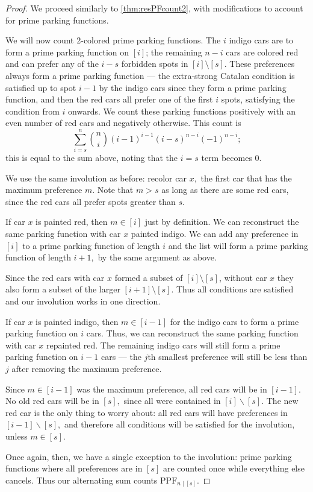 \documentclass[12 pt]{amsart}
\theoremstyle{definition} %
\theoremstyle{remark} %
\begin{document}
\begin{proof}
    We proceed similarly to \cref{thm:resPFcount2}, with modifications to account for prime parking functions.
    
    We will now count 2-colored prime parking functions. The $i$ indigo cars are to form a prime parking function on $[i]$; the remaining $n - i$ cars are colored red and can prefer any of the $i - s$ forbidden spots in  $[i] \setminus [s]$. These preferences always form a prime parking function --- the extra-strong Catalan condition is satisfied up to spot $i-1$ by the indigo cars since they form a prime parking function, and then the red cars all prefer one of the first $i$ spots, satisfying the condition from $i$ onwards. We count these parking functions positively with an even number of red cars and negatively otherwise. This count is
	\[
		\sum_{i = s}^{n} \binom{n}{i} (i - 1)^{i - 1} (i - s)^{n - i} (-1)^{n - i};
	\]
	this is equal to the sum above, noting that the $i=s$ term becomes 0.

	We use the same involution as before: recolor car $x,$ the first car that has the maximum preference $m.$ Note that $m > s$ as long as there are some red cars, since the red cars all prefer spots greater than $s$.

	If car $x$ is painted red, then  $m \in [i]$ just by definition. We can reconstruct the same parking function with car $x$ painted indigo. We can add any preference in $[i]$ to a prime parking function of length $i$ and the list will form a prime parking function of length $i + 1,$ by the same argument as above.
    
    Since the red cars with car $x$ formed a subset of $[i] \setminus [s]$, without car $x$ they also form a subset of the larger $[i + 1] \setminus [s]$. Thus all conditions are satisfied and our involution works in one direction.

	If car $x$ is painted indigo, then $m\in [i-1]$ for the indigo cars to form a prime parking function on $i$ cars. Thus, we can reconstruct the same parking function with car $x$ repainted red. The remaining indigo cars will still form a prime parking function on $i - 1$ cars --- the $j$th smallest preference will still be less than $j$ after removing the maximum preference.
    
    Since $m\in [i-1]$ was the maximum preference, all red cars will be in $[i-1]$. No old red cars will be in $[s],$ since all were contained in $[i]\backslash [s].$ The new red car is the only thing to worry about: all red cars will have preferences in $[i-1]\backslash [s],$ and therefore all conditions will be satisfied for the involution, unless $m\in [s].$

	Once again, then, we have a single exception to the involution: prime parking functions where all preferences are in $[s]$ are counted once while everything else cancels. Thus our alternating sum counts $\mathrm{PPF}_{n \mid [s]}$.
\end{proof}
\end{document}
